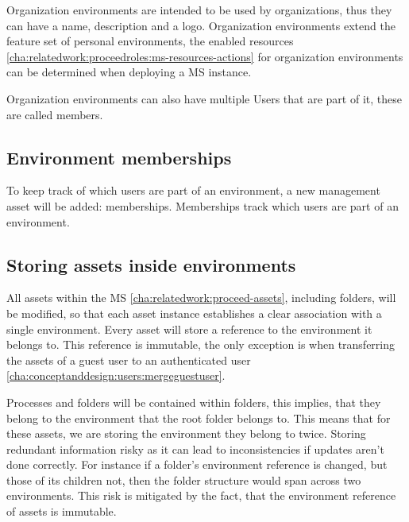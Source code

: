 Organization environments are intended to be used by organizations, thus they can have a
name, description and a logo.
Organization environments extend the feature set of personal environments, the enabled
resources \ref{cha:relatedwork:proceedroles:ms-resources-actions} for organization
environments can be determined when deploying a MS instance.

Organization environments can also have multiple Users that are part of it, these are
called members.

\subsection{Environment memberships}
\label{cha:conceptanddesign:environments:memberships}

To keep track of which users are part of an environment, a new management asset will be
added: memberships.
Memberships track which users are part of an environment.

\subsection{Storing assets inside environments}
\label{cha:conceptanddesign:environments:storing-assets}

All assets within the MS \ref{cha:relatedwork:proceed-assets}, including folders,
will be modified, so that each asset instance establishes a clear association with a single environment.
Every asset will store a reference to the environment it belongs to.
This reference is immutable, the only exception is when transferring the assets of a guest
user to an authenticated user \ref{cha:conceptanddesign:users:mergeguestuser}.

Processes and folders will be contained within folders, this implies, that they belong to
the environment that the root folder belongs to.
This means that for these assets, we are storing the environment they belong to twice.
Storing redundant information risky as it can lead to inconsistencies if updates aren't
done correctly.
For instance if a folder's environment reference is changed, but those of its children
not, then the folder structure would span across two environments.
This risk is mitigated by the fact, that the environment reference of assets is immutable.

